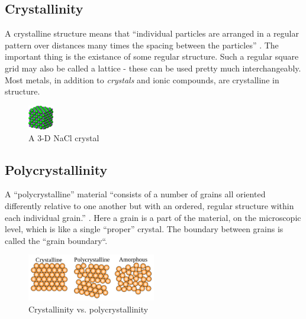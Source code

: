 \documentclass{article}
\begin{document}
    \subsection{Crystallinity}
    A crystalline structure means that ``individual particles are arranged in a
    regular pattern over distances many times the spacing between the
    particles'' \cite[p.~96]{OCRPhysics}. The important thing is the existance
    of some regular structure. Such a regular square grid may also be called a
    lattice - these can be used pretty much interchangeably. Most metals, in
    addition to \textit{crystals} and ionic compounds, are crystalline in
    structure.
    \begin{figure}[h]
        \includegraphics[width=0.1\textwidth]{crystal}
        \centering
        \caption{A 3-D NaCl crystal}
    \end{figure}
    \subsection{Polycrystallinity}
    A ``polycrystalline'' material ``consists of a number of grains all
    oriented differently relative to one another but with an ordered, regular
    structure within each individual grain.'' \cite[p.~98]{OCRPhysics}. Here a
    grain is a part of the material, on the microscopic level, which is like a
    single ``proper'' crystal. The boundary between grains is called the
    ``grain boundary``.
    \begin{figure}[h]
        \includegraphics[width=0.5\textwidth]{crystal_and_poly}
        \centering
        \caption{Crystallinity vs. polycrystallinity}
    \end{figure}
\end{document}
